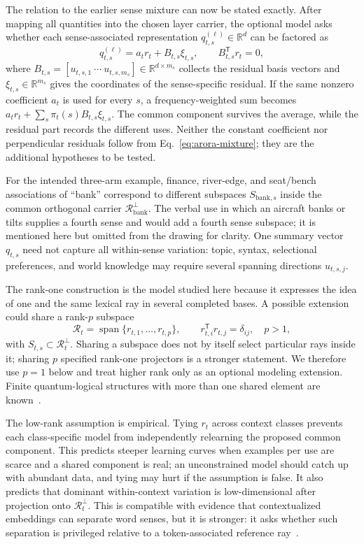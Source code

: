 \documentclass[
  aps,
  reprint,
  superscriptaddress,
  floatfix,
  nofootinbib,
  longbibliography
]{revtex4-2}
\newcommand{\R}{\mathbb{R}}
\newcommand{\T}{^{\mathsf{T}}}
\DeclareMathOperator{\spanop}{span}
\begin{document}
The relation to the earlier sense mixture can now be stated exactly.  After
mapping all quantities into the chosen layer carrier, the optional model asks
whether each sense-associated representation $q_{t,s}^{(\ell)}\in\R^d$ can be
factored as
%
\begin{equation}
\label{eq:sense-anchor-factorization}
q_{t,s}^{(\ell)}=a_t r_t+B_{t,s}\xi_{t,s},
\qquad B_{t,s}\T r_t=0,
\end{equation}
%
where $B_{t,s}=[u_{t,s,1}\ \cdots\ u_{t,s,m_s}]\in\R^{d\times m_s}$ collects
the residual basis vectors and $\xi_{t,s}\in\R^{m_s}$ gives the coordinates of
the sense-specific residual.  If the same nonzero coefficient $a_t$ is used for every $s$, a
frequency-weighted sum becomes
$a_t r_t+\sum_s\pi_t(s)B_{t,s}\xi_{t,s}$.  The common component survives the
average, while the residual part records the different uses.  Neither the
constant coefficient nor perpendicular residuals follow from
Eq.~\eqref{eq:arora-mixture}; they are the additional hypotheses to be tested.

For the intended three-arm example, finance, river-edge, and seat/bench
associations of ``bank'' correspond to different subspaces
$S_{\mathrm{bank},s}$ inside the common orthogonal carrier
$\mathcal R_{\mathrm{bank}}^\perp$.  The verbal use in which an aircraft
banks or tilts supplies a fourth sense and would add a fourth sense
subspace; it is mentioned here but omitted from the drawing for clarity.  One
summary vector $q_{t,s}$ need not capture all within-sense variation: topic,
syntax, selectional preferences, and world knowledge may require several
spanning directions $u_{t,s,j}$.

The rank-one construction is the model studied here because it expresses the
idea of one and the same lexical ray in several completed bases.  A possible extension
could share a rank-$p$ subspace
%
\begin{equation}
\label{eq:reference-subspace}
\mathcal R_t=
\spanop\{r_{t,1},\dots,r_{t,p}\},
\qquad r_{t,i}\T r_{t,j}=\delta_{ij},\quad p>1,
\end{equation}
%
with $S_{t,s}\subset\mathcal R_t^\perp$.  Sharing a subspace does not by itself
select particular rays inside it; sharing $p$ specified rank-one projectors is
a stronger statement.  We therefore use $p=1$ below and treat higher rank only
as an optional modeling extension.  Finite quantum-logical structures with
more than one shared element are known~\cite{svozil:040102}.

The low-rank assumption is empirical.  Tying $r_t$ across context classes
prevents each class-specific model from independently relearning the proposed common
component.  This predicts steeper learning curves when examples per use are
scarce and a shared component is real; an unconstrained model should catch up
with abundant data, and tying may hurt if the assumption is false.  It also predicts that dominant
within-context variation is low-dimensional after projection onto
$\mathcal R_t^\perp$.  This is compatible with evidence that contextualized
embeddings can separate word senses, but it is stronger: it asks whether
such separation is privileged relative to a token-associated reference
ray~\cite{wiedemann2019does,scarlini2020ares}.
\end{document}
